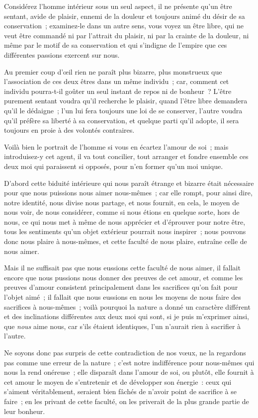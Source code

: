 \documentclass[french,twoside]{book} %
\newcommand\chaptercont{} %
\begin{document}
\chaptercont
\noindent Considérez l’homme intérieur sous un seul aspect, il ne présente qu’un être sentant, avide de plaisir, ennemi de la douleur et toujours animé du désir de sa conservation ; examinez-le dans un autre sens, vous voyez un être libre, qui ne veut être commandé ni par l’attrait du plaisir, ni par la crainte de la douleur, ni même par le motif de sa conservation et qui s’indigne de l’empire que ces différentes passions exercent sur nous.\par
Au premier coup d’œil rien ne paraît plus bizarre, plus monstrueux que l’association de ces deux êtres dans un même individu ; car, comment cet individu pourra-t-il goûter un seul instant de repos ni de bonheur ? L’être purement sentant voudra qu’il recherche le plaisir, quand l’être libre demandera qu’il le dédaigne ; l’un lui fera toujours une loi de se conserver, l’autre voudra qu’il préfère sa liberté à sa conservation, et quelque parti qu’il adopte, il sera toujours en proie à des volontés contraires.\par
Voilà bien le portrait de l’homme si vous en écartez l’amour de soi ; mais introduisez-y cet agent, il va tout concilier, tout arranger et fondre ensemble ces deux moi qui paraissent si opposés, pour n’en former qu’un moi unique.\par
D’abord cette biduité intérieure qui nous paraît étrange et bizarre était nécessaire pour que nous puissions nous aimer nous-mêmes ; car elle rompt, pour ainsi dire, notre identité, nous divise nous partage, et nous fournit, en cela, le moyen de nous voir, de nous considérer, comme si nous étions en quelque sorte, hors de nous, ce qui nous met à même de nous apprécier et d’éprouver pour notre être, tous les sentiments qu’un objet extérieur pourrait nous inspirer ; nous pouvons donc nous plaire à nous-mêmes, et cette faculté de nous plaire, entraîne celle de nous aimer.\par
Mais il ne suffisait pas que nous eussions cette faculté de nous aimer, il fallait encore que nous pussions nous donner des preuves de cet amour, et comme les preuves d’amour consistent principalement dans les sacrifices qu’on fait pour l’objet aimé ; il fallait que nous eussions en nous les moyens de nous faire des sacrifices à nous-mêmes ; voilà pourquoi la nature a donné un caractère différent et des inclinations différentes aux deux moi qui sont, si je puis m’exprimer ainsi, que {\itshape nous} aime nous, car s’ils étaient identiques, l’un n’aurait rien à sacrifier à l’autre.\par
Ne soyons donc pas surpris de cette contradiction de nos vœux, ne la regardons pas comme une erreur de la nature ; c’est notre indifférence pour nous-mêmes qui nous la rend onéreuse ; elle disparaît dans l’amour de soi, ou plutôt, elle fournit à cet amour le moyen de s’entretenir et de développer son énergie : ceux qui s’aiment véritablement, seraient bien fâchés de n’avoir point de sacrifice à se faire ; en les privant de cette faculté, on les priverait de la plus grande partie de leur bonheur.\par
\end{document}
